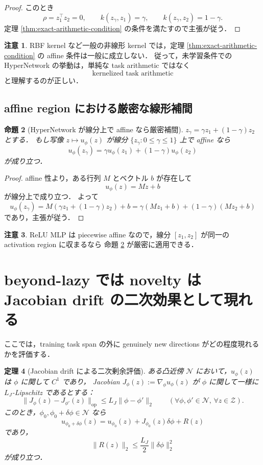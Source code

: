 \documentclass[a4paper,11pt]{bxjsarticle}
\newtheorem{theorem}{定理}[section]
\newtheorem{proposition}[theorem]{命題}
\theoremstyle{definition}
\newtheorem{remark}[theorem]{注意}
\begin{document}
\begin{proof}
このとき
\[
\rho=z_1^\top z_2=0,\qquad
k(z_\gamma,z_1)=\gamma,\qquad
k(z_\gamma,z_2)=1-\gamma.
\]
定理 \ref{thm:exact-arithmetic-condition} の条件を満たすので主張が従う．
\end{proof}

\begin{remark}
RBF kernel など一般の非線形 kernel では，定理 \ref{thm:exact-arithmetic-condition} の affine 条件は一般に成立しない．
従って，未学習条件での HyperNetwork の挙動は，単純な task arithmetic ではなく
\[
\text{kernelized task arithmetic}
\]
と理解するのが正しい．
\end{remark}

\subsection{affine region における厳密な線形補間}

\begin{proposition}[HyperNetwork が線分上で affine なら厳密補間]
\label{prop:affine-segment}
$z_\gamma=\gamma z_1+(1-\gamma)z_2$ とする．
もし写像 $z\mapsto u_\phi(z)$ が線分 $\{z_\gamma:0\le \gamma\le 1\}$ 上で affine なら
\[
u_\phi(z_\gamma)=\gamma u_\phi(z_1)+(1-\gamma)u_\phi(z_2)
\]
が成り立つ．
\end{proposition}

\begin{proof}
affine 性より，ある行列 $M$ とベクトル $b$ が存在して
\[
u_\phi(z)=Mz+b
\]
が線分上で成り立つ．
よって
\[
u_\phi(z_\gamma)=M(\gamma z_1+(1-\gamma)z_2)+b
=
\gamma(Mz_1+b)+(1-\gamma)(Mz_2+b)
\]
であり，主張が従う．
\end{proof}

\begin{remark}
ReLU MLP は piecewise affine なので，線分 $[z_1,z_2]$ が同一の activation region に収まるなら
命題 \ref{prop:affine-segment} が厳密に適用できる．
\end{remark}

\section{beyond-lazy では novelty は Jacobian drift の二次効果として現れる}

ここでは，training task span の外に genuinely new directions がどの程度現れるかを評価する．

\begin{theorem}[Jacobian drift による二次剰余評価]
\label{thm:jacobian-drift}
ある凸近傍 $\mathcal{N}$ において，$u_\phi(z)$ は $\phi$ に関して $C^1$ であり，
Jacobian $J_\phi(z):=\nabla_\phi u_\phi(z)$ が $\phi$ に関して一様に $L_J$-Lipschitz であるとする：
\[
\|J_{\phi}(z)-J_{\phi'}(z)\|_{\mathrm{op}}\le L_J\|\phi-\phi'\|_2
\qquad
(\forall \phi,\phi'\in\mathcal{N},\,\forall z\in\mathcal{Z}).
\]
このとき，$\phi_0,\phi_0+\delta\phi \in \mathcal{N}$ なら
\[
u_{\phi_0+\delta\phi}(z)
=
u_{\phi_0}(z)+J_{\phi_0}(z)\delta\phi+R(z)
\]
であり，
\[
\|R(z)\|_2 \le \frac{L_J}{2}\|\delta\phi\|_2^2
\]
が成り立つ．
\end{theorem}
\end{document}
